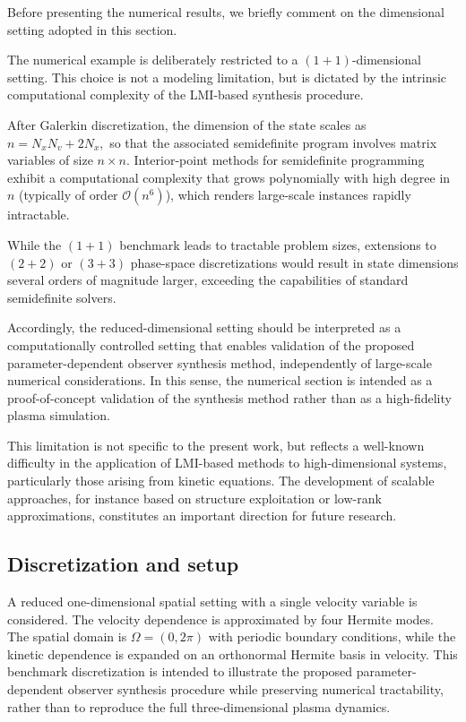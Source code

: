 \documentclass[AMA,Times2COL]{WileyNJDv5}
\begin{document}
Before presenting the numerical results, we briefly comment on the dimensional setting adopted in this section.

The numerical example is deliberately restricted to a $(1+1)$-dimensional setting. This choice is not a modeling limitation, but is dictated by the intrinsic computational complexity of the LMI-based synthesis procedure.

After Galerkin discretization, the dimension of the state scales as
\(
n = N_x N_v + 2N_x,
\)
so that the associated semidefinite program involves matrix variables of size
$n \times n$. Interior-point methods for semidefinite programming exhibit a computational complexity that grows polynomially with high degree in $n$ (typically of order $\mathcal{O}(n^6)$), which renders large-scale instances
rapidly intractable.

While the $(1+1)$ benchmark leads to tractable problem sizes, extensions to $(2+2)$ or $(3+3)$ phase-space discretizations would result in state dimensions several orders of magnitude larger, exceeding the capabilities of standard semidefinite solvers.

Accordingly, the reduced-dimensional setting should be interpreted as a computationally controlled setting that enables validation of the proposed parameter-dependent observer synthesis method, independently of large-scale
numerical considerations. In this sense, the numerical section is intended as a proof-of-concept validation of the synthesis method rather than as a high-fidelity plasma simulation.

This limitation is not specific to the present work, but reflects a well-known difficulty in the application of LMI-based methods to high-dimensional systems, particularly those arising from kinetic equations. The development of scalable approaches, for instance based on structure exploitation or low-rank approximations, constitutes an important direction for future research.

\subsection{Discretization and setup}

A reduced one-dimensional spatial setting with a single velocity variable is considered. The velocity dependence is approximated by four Hermite modes. The
spatial domain is $\Omega=(0,2\pi)$ with periodic boundary conditions, while the kinetic dependence is expanded on an orthonormal Hermite basis in velocity.
This benchmark discretization is intended to illustrate the proposed parameter-dependent observer synthesis procedure while preserving numerical tractability, rather than to reproduce the full three-dimensional plasma dynamics.
\end{document}
